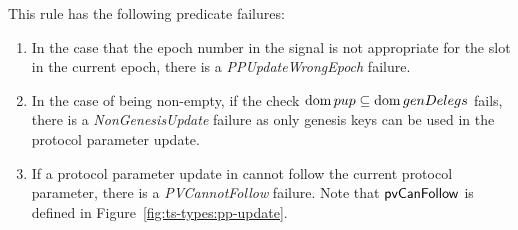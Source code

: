This rule has the following predicate failures:

\begin{enumerate}
\item In the case that the epoch number in the signal is not appropriate for the
  slot in the current epoch, there is a \emph{PPUpdateWrongEpoch} failure.
\item In the case of  being non-empty, if the check $\operatorname{dom} pup \subseteq
  \operatorname{dom} genDelegs$ fails, there is a \emph{NonGenesisUpdate} failure as only genesis keys
  can be used in the protocol parameter update.
\item If a protocol parameter update in  cannot follow the current
  protocol parameter, there is a \emph{PVCannotFollow} failure.
  Note that $\mathsf{pvCanFollow}$ is defined in Figure~\ref{fig:ts-types:pp-update}.
\end{enumerate}

